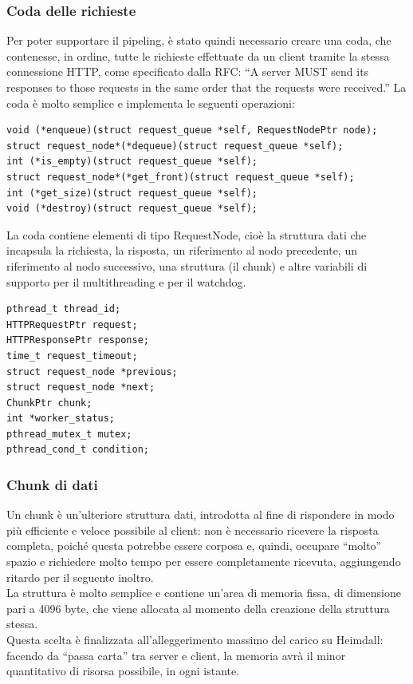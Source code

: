 \documentclass[italian]{tktltiki2}
\begin{document}
\subsubsection*{Coda delle richieste}
\label{sec:requests_queue}
Per poter supportare il pipeling, è stato quindi necessario creare una coda, che contenesse, in ordine, tutte le richieste effettuate da un client tramite la stessa connessione HTTP, come specificato dalla RFC: ``A server MUST send its responses to those requests in the same order that the requests were received.''\cite{pipeling}
La coda è molto semplice e implementa le seguenti operazioni:
\begin{lstlisting}
void (*enqueue)(struct request_queue *self, RequestNodePtr node);
struct request_node*(*dequeue)(struct request_queue *self);
int (*is_empty)(struct request_queue *self);
struct request_node*(*get_front)(struct request_queue *self);
int (*get_size)(struct request_queue *self);
void (*destroy)(struct request_queue *self);
\end{lstlisting}
La coda contiene elementi di tipo RequestNode, cioè la struttura dati che incapsula la richiesta, la risposta, un riferimento al nodo precedente, un riferimento al nodo successivo, una struttura (il chunk) e altre variabili di supporto per il multithreading e per il watchdog.
\begin{lstlisting}
pthread_t thread_id;
HTTPRequestPtr request;
HTTPResponsePtr response;
time_t request_timeout;
struct request_node *previous;
struct request_node *next;
ChunkPtr chunk;
int *worker_status;
pthread_mutex_t mutex;
pthread_cond_t condition;
\end{lstlisting}
\subsubsection*{Chunk di dati}
\label{sec:chunk}
Un chunk è un'ulteriore struttura dati, introdotta al fine di rispondere in modo più efficiente e veloce possibile al client: non è necessario ricevere la risposta completa, poiché questa potrebbe essere corposa e, quindi, occupare ``molto'' spazio e richiedere molto tempo per essere completamente ricevuta, aggiungendo ritardo per il seguente inoltro.
\\
La struttura è molto semplice e contiene un'area di memoria fissa, di dimensione pari a 4096 byte, che viene allocata al momento della creazione della struttura stessa.
\\
Questa scelta è finalizzata all'alleggerimento massimo del carico su Heimdall: facendo da ``passa carta'' tra server e client, la memoria avrà il minor quantitativo di risorsa possibile, in ogni istante. 
\end{document}
